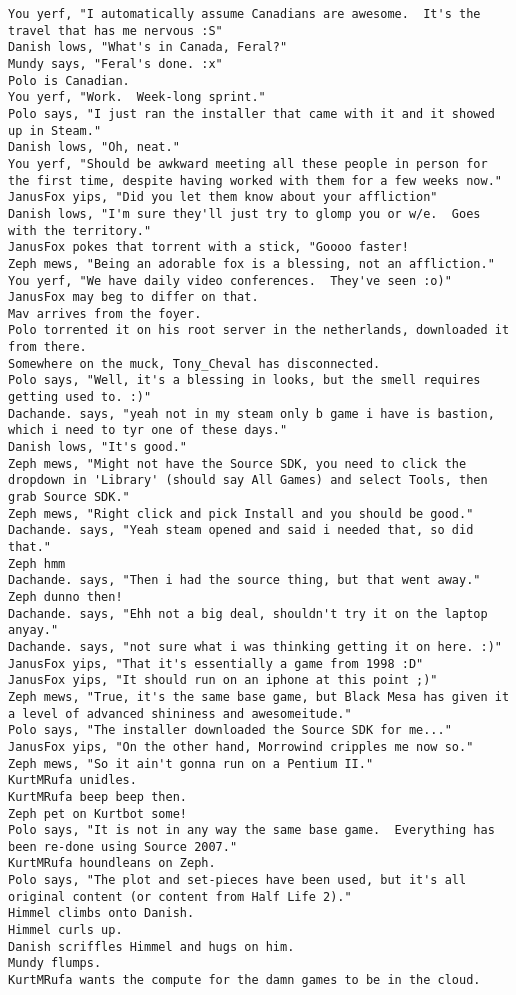 \begin{verbatim}
You yerf, "I automatically assume Canadians are awesome.  It's the travel that has me nervous :S"
Danish lows, "What's in Canada, Feral?"
Mundy says, "Feral's done. :x"
Polo is Canadian.
You yerf, "Work.  Week-long sprint."
Polo says, "I just ran the installer that came with it and it showed up in Steam."
Danish lows, "Oh, neat."
You yerf, "Should be awkward meeting all these people in person for the first time, despite having worked with them for a few weeks now."
JanusFox yips, "Did you let them know about your affliction"
Danish lows, "I'm sure they'll just try to glomp you or w/e.  Goes with the territory."
JanusFox pokes that torrent with a stick, "Goooo faster!
Zeph mews, "Being an adorable fox is a blessing, not an affliction."
You yerf, "We have daily video conferences.  They've seen :o)"
JanusFox may beg to differ on that.
Mav arrives from the foyer.
Polo torrented it on his root server in the netherlands, downloaded it from there.
Somewhere on the muck, Tony_Cheval has disconnected.
Polo says, "Well, it's a blessing in looks, but the smell requires getting used to. :)"
Dachande. says, "yeah not in my steam only b game i have is bastion, which i need to tyr one of these days."
Danish lows, "It's good."
Zeph mews, "Might not have the Source SDK, you need to click the dropdown in 'Library' (should say All Games) and select Tools, then grab Source SDK."
Zeph mews, "Right click and pick Install and you should be good."
Dachande. says, "Yeah steam opened and said i needed that, so did that."
Zeph hmm
Dachande. says, "Then i had the source thing, but that went away."
Zeph dunno then!
Dachande. says, "Ehh not a big deal, shouldn't try it on the laptop anyay."
Dachande. says, "not sure what i was thinking getting it on here. :)"
JanusFox yips, "That it's essentially a game from 1998 :D"
JanusFox yips, "It should run on an iphone at this point ;)"
Zeph mews, "True, it's the same base game, but Black Mesa has given it a level of advanced shininess and awesomeitude."
Polo says, "The installer downloaded the Source SDK for me..."
JanusFox yips, "On the other hand, Morrowind cripples me now so."
Zeph mews, "So it ain't gonna run on a Pentium II."
KurtMRufa unidles.
KurtMRufa beep beep then.
Zeph pet on Kurtbot some!
Polo says, "It is not in any way the same base game.  Everything has been re-done using Source 2007."
KurtMRufa houndleans on Zeph.
Polo says, "The plot and set-pieces have been used, but it's all original content (or content from Half Life 2)."
Himmel climbs onto Danish.
Himmel curls up.
Danish scriffles Himmel and hugs on him.
Mundy flumps.
KurtMRufa wants the compute for the damn games to be in the cloud.

\end{verbatim}
